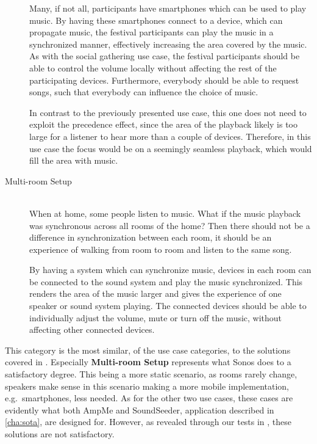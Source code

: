 \begin{description}
        Many, if not all, participants have smartphones which can be used to play music.
        By having these smartphones connect to a device, which can propagate music,
        the festival participants can play the music in a synchronized manner,
        effectively increasing the area covered by the music.
        As with the social gathering use case,
        the festival participants should be able to control the volume locally without affecting the rest of the participating devices.
        Furthermore, everybody should be able to request songs, such that everybody can influence the choice of music.

        In contrast to the previously presented use case, this one does not need to exploit the precedence effect, since the area of the playback likely is too large for a listener to hear more than a couple of devices.
        Therefore, in this use case the focus would be on a seemingly seamless playback, which would fill the area with music.

    \item[Multi-room Setup] \hfill\\
        When at home, some people listen to music.
        What if the music playback was synchronous across all rooms of the home?
        Then there should not be a difference in synchronization between each room,
        it should be an experience of walking from room to room and listen to the same song.

        By having a system which can synchronize music, devices in each room can be connected to the sound system and play the music synchronized.
        This renders the area of the music larger and gives the experience of one speaker or sound system playing.
        The connected devices should be able to individually adjust the volume, mute or turn off the music,
        without affecting other connected devices.
\end{description}

This category is the most similar, of the use case categories, to the solutions covered in .
Especially \textbf{Multi-room Setup} represents what Sonos does to a satisfactory degree.
This being a more static scenario, as rooms rarely change, speakers make sense in this scenario making a more mobile implementation, e.g.\ smartphones, less needed.
As for the other two use cases, these cases are evidently what both AmpMe and SoundSeeder, application described in \cref{cha:sota}, are designed for.
However, as revealed through our tests in , these solutions are not satisfactory.

